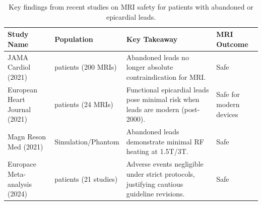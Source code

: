 \documentclass[final]{article}
\begin{document}
\begin{multicols}{3}
\begin{table}[H]
    \centering
    \renewcommand{\arraystretch}{1.5}
    \setlength{\tabcolsep}{8pt}
    \begin{tabular}{|>{\raggedright\arraybackslash}p{9.5cm}|
                      >{\raggedright\arraybackslash}p{5cm}|
                      >{\raggedright\arraybackslash}p{12.5cm}|
                      >{\raggedright\arraybackslash}p{5cm}|}
        \hline
        \textbf{Study Name} & \textbf{Population} & \textbf{Key Takeaway} & \textbf{MRI Outcome} \\
        \hline
        JAMA Cardiol (2021) \cite{schaller2021} & 
        139 patients (200 MRIs) & 
        Abandoned leads no longer absolute contraindication for MRI. & 
        Safe \\
        \hline
        European Heart Journal (2021) \cite{vuorinen2021} & 
        16 patients (24 MRIs) & 
        Functional epicardial leads pose minimal risk when leads are modern (post-2000). & 
        Safe for modern devices \\
        \hline
        Magn Reson Med (2021) \cite{nguyen2021} & 
        Simulation/Phantom & 
        Abandoned leads demonstrate minimal RF heating at 1.5T/3T. & 
        Safe \\
        \hline
        Europace Meta-analysis (2024) \cite{meier2024} & 
        656 patients (21 studies) & 
        Adverse events negligible under strict protocols, justifying cautious guideline revisions. & 
        Safe \\
        \hline
    \end{tabular}
    \caption{Key findings from recent studies on MRI safety for patients with abandoned or epicardial leads.}
    \label{tab:recent_findings}
\end{table}



\end{multicols}
\end{document}
